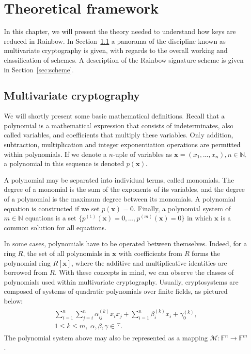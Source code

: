 \documentclass[openright]{report}
\begin{document}
\chapter{Theoretical framework}

In this chapter, we will present the theory needed to understand how keys are reduced in Rainbow. In Section~\ref{sec:mult} a panorama of the discipline known as multivariate cryptography is given, with regards to the overall working and classification of schemes. A description of the Rainbow signature scheme is given in Section~\ref{sec:scheme}. 


\section{Multivariate cryptography}\label{sec:mult}

We will shortly present some basic mathematical definitions. Recall that a polynomial is a mathematical expression that consists of indeterminates, also called variables, and coefficients that multiply these variables. Only addition, subtraction, multiplication and integer exponentiation operations are permitted within polynomials. If we denote a $n$-uple of variables as $\mathbf{x} = (x_{1}, \dots, x_{n}), n \in \mathbb{N}$, a polynomial in this sequence is denoted $p(\mathbf{x})$. 

A polynomial may be separated into individual terms, called monomials. The degree of a monomial is the sum of the exponents of its variables, and the degree of a polynomial is the maximum degree between its monomials. A polynomial equation is constructed if we set $p(\mathbf{x}) = 0$. Finally, a polynomial system of $m \in \mathbb{N}$ equations is a set $\{p^{(1)}(\mathbf{x}) = 0, \dots, p^{(m)}(\mathbf{x}) = 0\}$ in which $\mathbf{x}$ is a common solution for all equations.

In some cases, polynomials have to be operated between themselves. Indeed, for a ring $R$, the set of all polynomials in $\mathbf{x}$ with coefficients from $R$ forms the polynomial ring $R[\mathbf{x}]$, where the additive and multiplicative identities are borrowed from $R$. With these concepts in mind, we can observe the classes of polynomials used within multivariate cryptography. Usually, cryptosystems are composed of systems of quadratic polynomials over finite fields, as pictured below:
\begin{align}
    \begin{split}
        \sum_{i = 1}^{n} \sum_{j = i}^{n} \alpha_{ij}^{(k)} x_{i} x_{j} + \sum_{i = 1}^{n} \beta_{i}^{(k)} x_{i} + \gamma_{0}^{(k)}, \\
        1 \leq k \leq m, \; \alpha, \beta, \gamma \in \mathbb{F}.
    \end{split}
\end{align}
The polynomial system above may also be represented as a mapping $\mathcal{M}: \mathbb{F}^{n} \to \mathbb{F}^{m}$.
\end{document}
